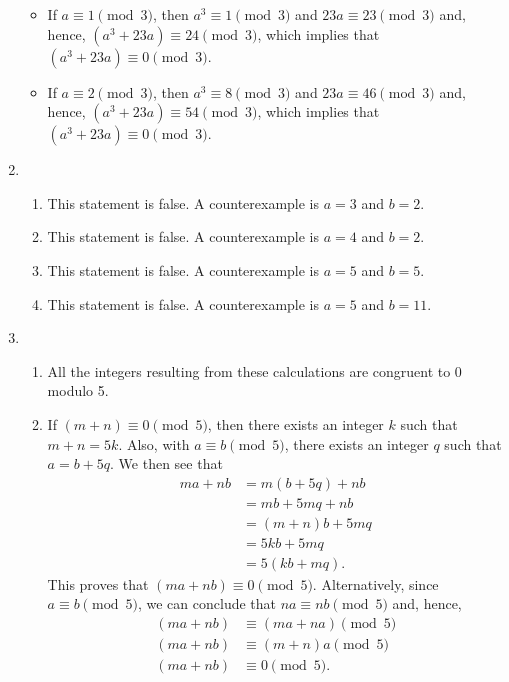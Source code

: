 \begin{enumerate}
\begin{itemize}
\item If $a \equiv 1 \pmod 3$, then $a^3 \equiv 1 \pmod 3$ and 
$23a \equiv 23 \pmod 3$ and, hence, $\left(a^3 + 23a \right) \equiv 24 \pmod 3$, which implies that $\left(a^3 + 23a \right) \equiv 0 \pmod 3$.

\item If $a \equiv 2 \pmod 3$, then $a^3 \equiv 8 \pmod 3$ and 
$23a \equiv 46 \pmod 3$ and, hence, $\left(a^3 + 23a \right) \equiv 54 \pmod 3$, which implies that $\left(a^3 + 23a \right) \equiv 0 \pmod 3$.
\end{itemize}


\item \begin{enumerate}
\item This statement is false.  A counterexample is $a = 3$ and $b = 2$.

\item This statement is false.  A counterexample is $a = 4$ and $b = 2$.

\item This statement is false.  A counterexample is $a = 5$ and $b = 5$.

\item This statement is false.  A counterexample is $a = 5$ and $b = 11$.
\end{enumerate}




\item \begin{enumerate}
\item All the integers resulting from these calculations are congruent to 0 modulo 5.

\item If $(m + n) \equiv 0 \pmod 5$, then there exists an integer $k$ such that $m + n = 5k$.  Also, with $a \equiv b \pmod 5$, there exists an integer $q$ such that $a = b + 5q$.  We then see that
\begin{align*}
ma + nb &= m(b + 5q) + nb \\
        &= mb + 5mq + nb \\
        &= (m + n)b + 5mq \\
        &= 5kb + 5mq \\
        &= 5(kb + mq).
\end{align*}
This proves that $(ma + nb) \equiv 0 \pmod 5$.  Alternatively, since $a \equiv b \pmod 5$, we can conclude that $na \equiv nb \pmod 5$ and, hence, 
\begin{align*}
(ma + nb) &\equiv (ma + na) \pmod 5 \\
(ma + nb) &\equiv (m + n)a \pmod 5 \\
(ma + nb) &\equiv 0 \pmod 5.
\end{align*}
\end{enumerate}
\end{enumerate}


